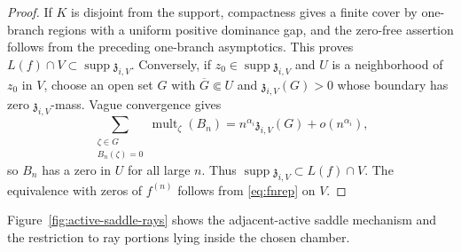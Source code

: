 \documentclass[reqno]{article}
\theoremstyle{definition}
\theoremstyle{remark}
\theoremstyle{plain}
\begin{document}
\begin{proof}
If $K$ is disjoint from the support, compactness gives a finite cover by one-branch regions with a uniform positive dominance gap, and the zero-free assertion follows from the preceding one-branch asymptotics. This proves $L(f)\cap V\subset\operatorname{supp}\mathfrak z_{i,V}$. Conversely, if $z_0\in\operatorname{supp}\mathfrak z_{i,V}$ and $U$ is a neighborhood of $z_0$ in $V$, choose an open set $G$ with $\overline G\Subset U$ and $\mathfrak z_{i,V}(G)>0$ whose boundary has zero $\mathfrak z_{i,V}$-mass. Vague convergence gives
\[
\sum_{\substack{\zeta\in G\\ B_n(\zeta)=0}}\operatorname{mult}_\zeta(B_n)
=n^{\alpha_i}\mathfrak z_{i,V}(G)+o(n^{\alpha_i}),
\]
so $B_n$ has a zero in $U$ for all large $n$. Thus $\operatorname{supp}\mathfrak z_{i,V}\subset L(f)\cap V$. The equivalence with zeros of $f^{(n)}$ follows from \eqref{eq:fnrep} on $V$.
\end{proof}

Figure~\ref{fig:active-saddle-rays} shows the adjacent-active saddle mechanism and the restriction to ray portions lying inside the chosen chamber.
\end{document}
